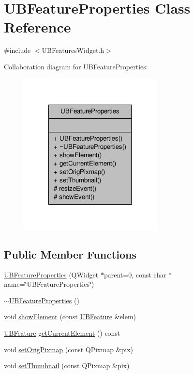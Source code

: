 \hypertarget{class_u_b_feature_properties}{\section{U\-B\-Feature\-Properties Class Reference}
\label{dd/dc8/class_u_b_feature_properties}
}


{\ttfamily \#include $<$U\-B\-Features\-Widget.\-h$>$}



Collaboration diagram for U\-B\-Feature\-Properties\-:
\nopagebreak
\begin{figure}[H]
\begin{center}
\leavevmode
\includegraphics[width=208pt]{db/de1/class_u_b_feature_properties__coll__graph}
\end{center}
\end{figure}
\subsection*{Public Member Functions}
\begin{DoxyCompactItemize}
\item 
\hyperlink{class_u_b_feature_properties_ac62ad70b89370327d9ed3f9f88a68415}{U\-B\-Feature\-Properties} (Q\-Widget $\ast$parent=0, const char $\ast$name=\char`\"{}U\-B\-Feature\-Properties\char`\"{})
\item 
\hyperlink{class_u_b_feature_properties_af322b247759b5be8558feacea026f081}{$\sim$\-U\-B\-Feature\-Properties} ()
\item 
void \hyperlink{class_u_b_feature_properties_aa097498180eb7f30b140df748e3fee5f}{show\-Element} (const \hyperlink{class_u_b_feature}{U\-B\-Feature} \&elem)
\item 
\hyperlink{class_u_b_feature}{U\-B\-Feature} \hyperlink{class_u_b_feature_properties_a96e892c1fd9157f749397aac981e2234}{get\-Current\-Element} () const 
\item 
void \hyperlink{class_u_b_feature_properties_af9386acd28963fbcfaf86a6855143ca5}{set\-Orig\-Pixmap} (const Q\-Pixmap \&pix)
\item 
void \hyperlink{class_u_b_feature_properties_ae2597b9ac62da4a10a9d3399b3a90a74}{set\-Thumbnail} (const Q\-Pixmap \&pix)
\end{DoxyCompactItemize}
